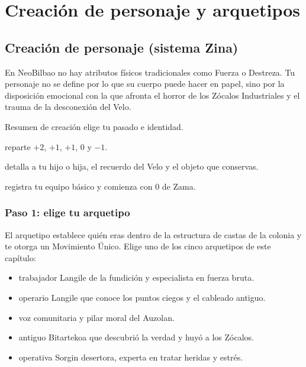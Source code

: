 \chapter{Creación de personaje y arquetipos}

\section{Creación de personaje (sistema Zina)}

En NeoBilbao no hay atributos físicos tradicionales como Fuerza o Destreza. Tu personaje no se define por lo que su cuerpo puede hacer en papel, sino por la disposición emocional con la que afronta el horror de los Zócalos Industriales y el trauma de la desconexión del Velo.

\begin{CajaRegla}{Resumen de creación}
 elige tu pasado e identidad.\par
{} reparte $+2$, $+1$, $+1$, $0$ y $-1$.\par
{} detalla a tu hijo o hija, el recuerdo del Velo y el objeto que conservas.\par
{} registra tu equipo básico y comienza con 0 de Zama.
\end{CajaRegla}

\subsection{Paso 1: elige tu arquetipo}

El arquetipo establece quién eras dentro de la estructura de castas de la colonia y te otorga un Movimiento Único. Elige uno de los cinco arquetipos de este capítulo:

\begin{itemize}
  \item {} trabajador Langile de la fundición y especialista en fuerza bruta.
  \item {} operario Langile que conoce los puntos ciegos y el cableado antiguo.
  \item {} voz comunitaria y pilar moral del Auzolan.
  \item {} antiguo Bitartekoa que descubrió la verdad y huyó a los Zócalos.
  \item {} operativa Sorgin desertora, experta en tratar heridas y estrés.
\end{itemize}

